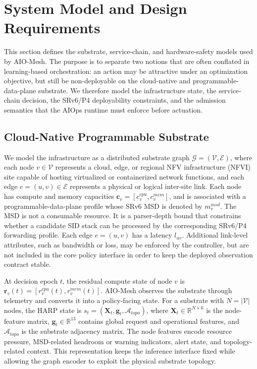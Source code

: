\documentclass[final,5p]{elsarticle}
\newcommand{\rev}[1]{\textcolor{BrickRed}{#1}}
\begin{document}
\section{System Model and Design Requirements}
\label{sec:system_model}

This section defines the substrate, service-chain, and hardware-safety models used by AIO-Mesh. The purpose is to separate two notions that are often conflated in learning-based orchestration: an action may be attractive under an optimization objective, but still be non-deployable on the cloud-native and programmable-data-plane substrate. We therefore model the infrastructure state, the service-chain decision, the SRv6/P4 deployability constraints, and the admission semantics that the AIOps runtime must enforce before actuation.

\subsection{Cloud-Native Programmable Substrate}
\label{subsec:infrastructure_model}

We model the infrastructure as a distributed substrate graph $\mathcal{G}=(\mathcal{V},\mathcal{E})$, where each node \(v\in\mathcal{V}\) represents a cloud, edge, or regional \rev{NFV infrastructure (NFVI)} site capable of hosting virtualized or containerized network functions, and each edge \(e=(u,v)\in\mathcal{E}\) represents a physical or logical inter-site link. Each node has compute and memory capacities $\mathbf{c}_v=\left[c_v^{cpu},c_v^{mem}\right]$, and is associated with a programmable-data-plane profile whose SRv6 \rev{MSD} is denoted by \(m_v^{msd}\). The MSD is not a consumable resource. It is a parser-depth bound that constrains whether a candidate SID stack can be processed by the corresponding SRv6/P4 forwarding profile. Each edge \(e=(u,v)\) has a latency \(l_{uv}\). Additional link-level attributes, such as bandwidth or loss, may be enforced by the controller, but are not included in the core policy interface in order to keep the deployed observation contract stable.

At decision epoch \(t\), the residual compute state of node \(v\) is $\mathbf{r}_v(t)=\left[r_v^{cpu}(t),r_v^{mem}(t)\right]$. AIO-Mesh observes the substrate through telemetry and converts it into a policy-facing state. For a substrate with \(N=|\mathcal{V}|\) nodes, the HARP state is $s_t=(\mathbf{X}_t,\mathbf{g}_t,\mathcal{A}_{topo})$, where \(\mathbf{X}_t\in\mathbb{R}^{N\times 6}\) is the node-feature matrix, \(\mathbf{g}_t\in\mathbb{R}^{13}\) contains global request and operational features, and \(\mathcal{A}_{topo}\) is the substrate adjacency matrix. The node features encode resource pressure, MSD-related headroom or warning indicators, alert state, and topology-related context. This representation keeps the inference interface fixed while allowing the graph encoder to exploit the physical substrate topology.
\end{document}
